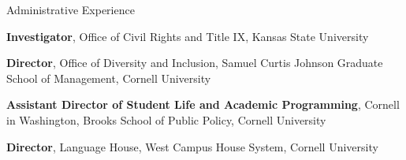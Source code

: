 \begin{rubric}{Administrative Experience}

        \textbf{Investigator}, Office of Civil Rights and Title IX, Kansas State University
    
    \entry*[2021 -- 2023][\faUniversity
    ]%
        \textbf{Director}, Office of Diversity and Inclusion, Samuel Curtis Johnson Graduate School of Management, Cornell University
        
        \entry*[2020 -- 2021][\faUniversity
    ]%
        \textbf{Assistant Director of Student Life and Academic Programming}, Cornell in Washington, Brooks School of Public Policy, Cornell University
        
        \entry*[2016 -- 2020][\faUniversity
    ]%
        \textbf{Director}, Language House, West Campus House System, Cornell University
        
    \end{rubric}